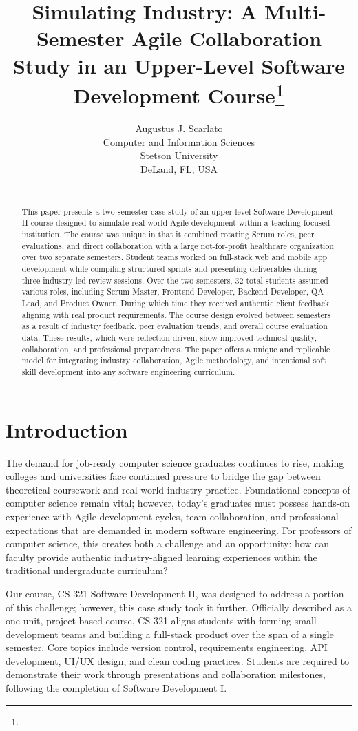\documentclass{article}
\title{Simulating Industry: A Multi-Semester Agile Collaboration Study in an Upper-Level Software Development Course\footnote{\protect}
}
\author{
Augustus J. Scarlato\\
Computer and Information Sciences\\
Stetson University\\
DeLand, FL, USA\\
\email{ascarlato@stetson.edu}\\
}
\begin{document}
\maketitle

\begin{abstract}
This paper presents a two-semester case study of an upper-level Software Development II course designed to simulate real-world Agile development within a teaching-focused institution. The course was unique in that it combined rotating Scrum roles, peer evaluations, and direct collaboration with a large not-for-profit healthcare organization over two separate semesters. Student teams worked on full-stack web and mobile app development while compiling structured sprints and presenting deliverables during three industry-led review sessions. Over the two semesters, 32 total students assumed various roles, including Scrum Master, Frontend Developer, Backend Developer, QA Lead, and Product Owner. During which time they received authentic client feedback aligning with real product requirements. The course design evolved between semesters as a result of industry feedback, peer evaluation trends, and overall course evaluation data. These results, which were reflection-driven, show improved technical quality, collaboration, and professional preparedness. The paper offers a unique and replicable model for integrating industry collaboration, Agile methodology, and intentional soft skill development into any software engineering curriculum.
\end{abstract}

\section{Introduction}
The demand for job-ready computer science graduates continues to rise, making colleges and universities face continued pressure to bridge the gap between theoretical coursework and real-world industry practice. Foundational concepts of computer science remain vital; however, today’s graduates must possess hands-on experience with Agile development cycles, team collaboration, and professional expectations that are demanded in modern software engineering. For professors of computer science, this creates both a challenge and an opportunity: how can faculty provide authentic industry-aligned learning experiences within the traditional undergraduate curriculum?

Our course, CS 321 Software Development II, was designed to address a portion of this challenge; however, this case study took it further. Officially described as a one-unit, project-based course, CS 321 aligns students with forming small development teams and building a full-stack product over the span of a single semester. Core topics include version control, requirements engineering, API development, UI/UX design, and clean coding practices. Students are required to demonstrate their work through presentations and collaboration milestones, following the completion of Software Development I.
\end{document}

